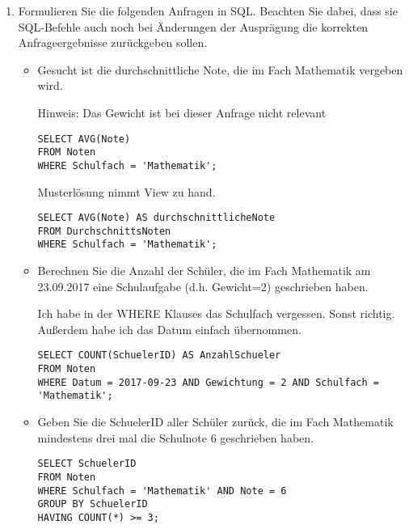 \documentclass{lehramt-informatik-aufgabe}
\begin{document}
\begin{enumerate}
\item Formulieren Sie die folgenden Anfragen in SQL. Beachten Sie dabei,
dass sie SQL-Befehle auch noch bei Änderungen der Ausprägung die
korrekten Anfrageergebnisse zurückgeben sollen.

\begin{itemize}

%

\item Gesucht ist die durchschnittliche Note, die im Fach Mathematik
vergeben wird.

Hinweis: Das Gewicht ist bei dieser Anfrage nicht relevant

\begin{antwort}
\begin{verbatim}
SELECT AVG(Note)
FROM Noten
WHERE Schulfach = 'Mathematik';
\end{verbatim}
\end{antwort}

Musterlösung nimmt View zu hand.

\begin{antwort}[muster]
\begin{verbatim}
SELECT AVG(Note) AS durchschnittlicheNote
FROM DurchschnittsNoten
WHERE Schulfach = 'Mathematik';
\end{verbatim}
\end{antwort}

%

\item Berechnen Sie die Anzahl der Schüler, die im Fach Mathematik am
23.09.2017 eine Schulaufgabe (d.h. Gewicht=2) geschrieben haben.

\begin{antwort}[muster]
Ich habe in der WHERE Klauses das Schulfach vergessen. Sonst richtig.
Außerdem habe ich das Datum einfach übernommen.
\begin{verbatim}
SELECT COUNT(SchuelerID) AS AnzahlSchueler
FROM Noten
WHERE Datum = 2017-09-23 AND Gewichtung = 2 AND Schulfach = 'Mathematik';
\end{verbatim}
\end{antwort}

%

\item Geben Sie die SchuelerID aller Schüler zurück, die im Fach
Mathematik mindestens drei mal die Schulnote 6 geschrieben haben.

\begin{antwort}[muster]
\begin{verbatim}
SELECT SchuelerID
FROM Noten
WHERE Schulfach = 'Mathematik' AND Note = 6
GROUP BY SchuelerID
HAVING COUNT(*) >= 3;
\end{verbatim}
\end{antwort}


\end{itemize}
\end{enumerate}
\end{document}
